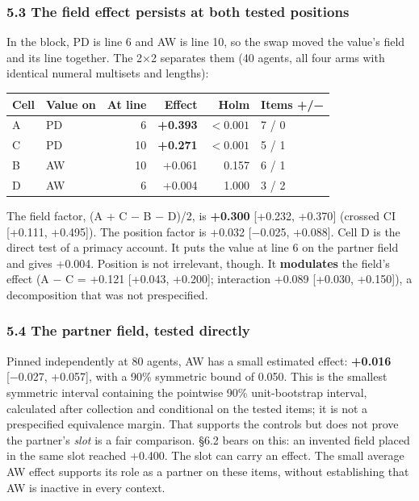 \documentclass[
  11pt]{article}
\begin{document}
\subsubsection{5.3 The field effect persists at both tested
positions}\label{the-field-effect-persists-at-both-tested-positions}

In the block, PD is line 6 and AW is line 10, so the swap moved the
value's field and its line together. The 2×2 separates them (40 agents,
all four arms with identical numeral multisets and lengths):

\begin{longtable}[]{@{}llrrrl@{}}
\toprule\noalign{}
Cell & Value on & At line & Effect & Holm & Items +/− \\
\midrule\noalign{}
\endhead
\bottomrule\noalign{}
\endlastfoot
A & PD & 6 & \textbf{+0.393} & \(<0.001\) & 7 / 0 \\
C & PD & 10 & \textbf{+0.271} & \(<0.001\) & 5 / 1 \\
B & AW & 10 & +0.061 & 0.157 & 6 / 1 \\
D & AW & 6 & +0.004 & 1.000 & 3 / 2 \\
\end{longtable}

The field factor, (A + C − B − D)/2, is \textbf{+0.300} {[}+0.232,
+0.370{]} (crossed CI {[}+0.111, +0.495{]}). The position factor is
+0.032 {[}−0.025, +0.088{]}. Cell D is the direct test of a primacy
account. It puts the value at line 6 on the partner field and gives
+0.004. Position is not irrelevant, though. It \textbf{modulates} the
field's effect (A − C = +0.121 {[}+0.043, +0.200{]}; interaction +0.089
{[}+0.030, +0.150{]}), a decomposition that was not prespecified.

\subsubsection{5.4 The partner field, tested
directly}\label{the-partner-field-tested-directly}

Pinned independently at 80 agents, AW has a small estimated effect:
\textbf{+0.016} {[}−0.027, +0.057{]}, with a 90\% symmetric bound of
0.050. This is the smallest symmetric interval containing the pointwise
90\% unit-bootstrap interval, calculated after collection and
conditional on the tested items; it is not a prespecified equivalence
margin. That supports the controls but does not prove the partner's
\emph{slot} is a fair comparison. §6.2 bears on this: an invented field
placed in the same slot reached +0.400. The slot can carry an effect.
The small average AW effect supports its role as a partner on these
items, without establishing that AW is inactive in every context.
\end{document}

